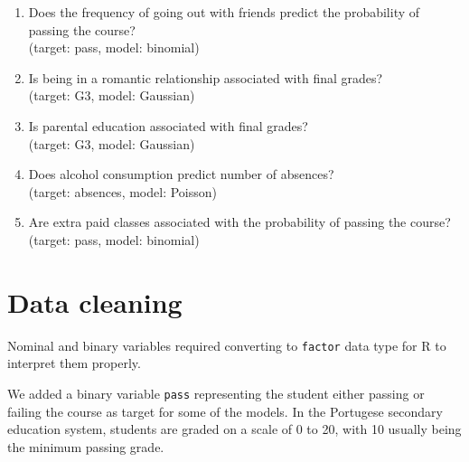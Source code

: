 \documentclass[12pt, a4paper]{article}\usepackage[]{graphicx}\usepackage[]{xcolor}
\begin{document}
\begin{enumerate}
    \item Does the frequency of going out with friends predict the probability of passing the course?\\(target: pass, model: binomial)
    \item Is being in a romantic relationship associated with final grades?\\(target: G3, model: Gaussian)
    \item Is parental education associated with final grades?\\(target: G3, model: Gaussian)
    \item Does alcohol consumption predict number of absences?\\(target: absences, model: Poisson)
    \item Are extra paid classes associated with the probability of passing the course?\\(target: pass, model: binomial)
\end{enumerate}


\newpage

\section{Data cleaning}

Nominal and binary variables required converting to \texttt{factor} data type for R to interpret them properly.

We added a binary variable \texttt{pass} representing the student either passing or failing the course as target for some of the models. In the Portugese secondary education system, students are graded on a scale of 0 to 20, with 10 usually being the minimum passing grade.
\end{document}
